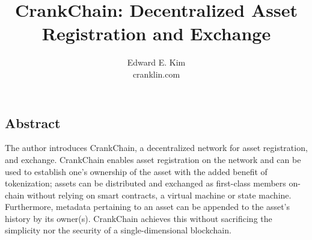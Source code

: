 \documentclass[10pt,twocolumn]{article}
\begin{document}
\title{CrankChain: Decentralized Asset Registration and Exchange}
\author{
{\normalsize Edward E. Kim}\\
\normalsize cranklin.com
}
\date{}

\maketitle
\subsection*{Abstract}
The author introduces CrankChain, a decentralized network for asset registration, and exchange.  CrankChain enables asset registration on the network and can be used to establish one's ownership of the asset with the added benefit of tokenization; assets can be distributed and exchanged as first-class members on-chain without relying on smart contracts, a virtual machine or state machine.  Furthermore, metadata pertaining to an asset can be appended to the asset's history by its owner(s).  CrankChain achieves this without sacrificing the simplicity nor the security of a single-dimensional blockchain.
\end{document}
